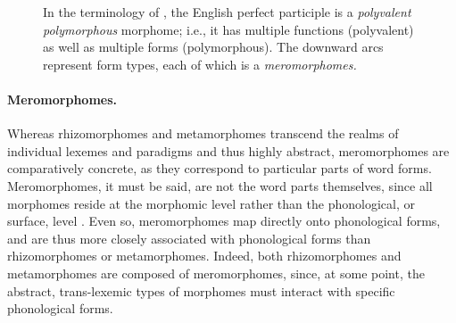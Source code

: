 \begin{figure}[ht]
\centering
\label{fig:ppgraph}
\caption{In the terminology of \citet{aronoff:1994}, the English perfect participle  is a \emph{polyvalent polymorphous} morphome; i.e., it has multiple functions (polyvalent) as well as multiple forms (polymorphous). The downward arcs represent form types, each of which is a \emph{meromorphomes.}}
\end{figure}

\paragraph{Meromorphomes.} Whereas rhizomorphomes and metamorphomes 
transcend the realms of individual lexemes and paradigms and thus highly 
abstract, meromorphomes are comparatively concrete, as they 
correspond to particular parts of word forms. Meromorphomes, it must be said, 
are not the word parts themselves, since all morphomes reside at the 
morphomic level rather than the phonological, or surface, level \citep{round:2011}. 
Even so, meromorphomes map directly onto phonological forms, and 
are thus more closely associated with phonological forms than rhizomorphomes 
or metamorphomes. Indeed, both rhizomorphomes and metamorphomes are 
composed of meromorphomes, since, at some point, the abstract, trans-lexemic 
types of morphomes must interact with specific phonological forms. 

